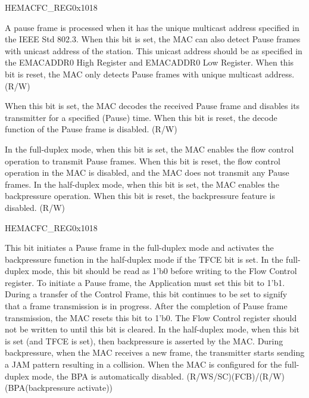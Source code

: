 \begin{register}{H}{EMACFC\_REG}{0x1018}
\begin{regdesc}
\begin{reglist}
\item [UPFD]A pause frame is processed when it has the unique multicast address specified in the IEEE Std 802.3. When this bit is set, the MAC can also detect Pause frames with unicast address of the station. This unicast address should be as specified in the EMACADDR0 High Register and EMACADDR0 Low Register. When this bit is reset, the MAC only detects Pause frames with unique multicast address. (R/W)
\item [RFCE]When this bit is set, the MAC decodes the received Pause frame and disables its transmitter for a specified (Pause) time. When this bit is reset, the decode function of the Pause frame is disabled. (R/W)
\item [TFCE]In the full-duplex mode, when this bit is set, the MAC enables the flow control operation to transmit Pause frames. When this bit is reset, the flow control operation in the MAC is disabled, and the MAC does not transmit any Pause frames. In the half-duplex mode, when this bit is set, the MAC enables the backpressure operation. When this bit is reset, the backpressure feature is disabled. (R/W)

\item [Continued on the next page...]
\end{reglist}\end{regdesc}
\end{register}

\addtocounter{Regfloat}{-1}
\begin{register}{H}{EMACFC\_REG}{0x1018}
\begin{regdesc}\begin{reglist}
\item [Continued from the previous page...]
\item [FCBBA]This bit initiates a Pause frame in the full-duplex mode and activates the backpressure function in the half-duplex mode if the TFCE bit is set. In the full-duplex mode, this bit should be read as 1'b0 before writing to the Flow Control register. To initiate a Pause frame, the Application must set this bit to 1'b1. During a transfer of the Control Frame, this bit continues to be set to signify that a frame transmission is in progress. After the completion of Pause frame transmission, the MAC resets this bit to 1'b0. The Flow Control register should not be written to until this bit is cleared. In the half-duplex mode, when this bit is set (and TFCE is set), then backpressure is asserted by the MAC. During backpressure, when the MAC receives a new frame, the transmitter starts sending a JAM pattern resulting in a collision. When the MAC is configured for the full-duplex mode, the BPA is automatically disabled. (R/WS/SC)(FCB)/(R/W)(BPA(backpressure activate))
\end{reglist}\end{regdesc}
\end{register}


